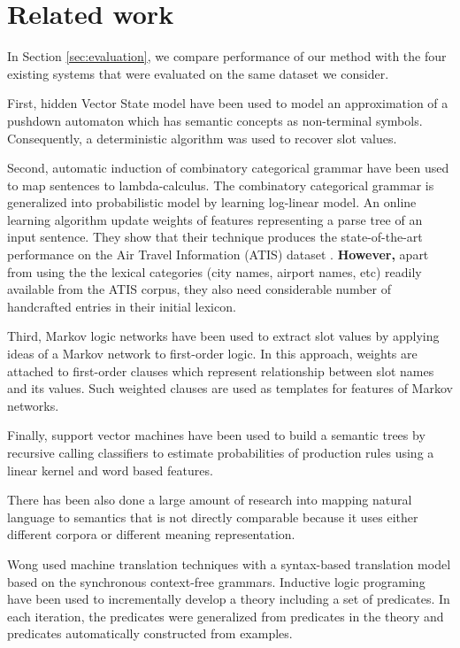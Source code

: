 \documentclass{article}
\begin{document}
\section{Related work}

In Section \ref{sec:evaluation}, we compare performance of our method with the four existing systems that were evaluated on the same dataset we consider. 

First, hidden Vector State model \cite{he06} have been used to model an approximation of a pushdown automaton which has semantic concepts as non-terminal symbols. Consequently, a deterministic algorithm was used to recover slot values.

Second, automatic induction of combinatory categorical grammar \cite{zettlemoyer07} have been used to map sentences to lambda-calculus. The combinatory categorical grammar is generalized into probabilistic model by learning log-linear model. An online learning algorithm update weights of features representing a parse tree of an input sentence. They show that their technique produces the state-of-the-art performance on the Air Travel Information (ATIS) dataset \cite{atis94}. \textbf{However, }apart from using the the lexical categories (city names, airport names, etc) readily available from the ATIS corpus, they also need considerable number of handcrafted entries in their initial lexicon. 

Third, Markov logic networks \cite{meza08a,meza08b} have been used to extract slot values by applying ideas of a Markov network to first-order logic. In this approach, weights are attached to first-order clauses which represent relationship between slot names and its values. Such weighted clauses are used as templates for features of Markov networks.

Finally, support vector machines \cite{mairesse09} have been used to build a semantic trees by recursive calling classifiers to estimate probabilities of production rules using a linear kernel and word based features.

There has been also done a large amount of research into mapping natural language to semantics that is not directly comparable because it uses either different corpora or different meaning representation. 

Wong \cite{wong06} used machine translation techniques with a syntax-based translation model based on the synchronous context-free grammars. 
Inductive logic programing \cite{tang01} have been used to incrementally develop a theory including a set of predicates. In each iteration, the predicates were generalized from predicates in the theory and predicates automatically constructed from examples. 
\end{document}
